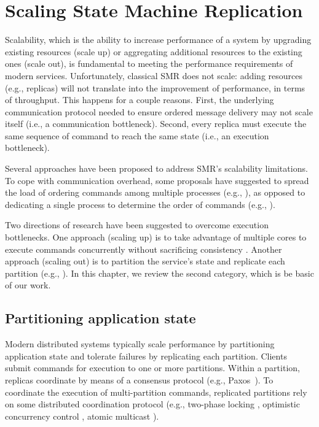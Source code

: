 \chapter[Scaling State Machine Replication]{Scaling State Machine Replication}

Scalability, which is the ability to increase performance of a system by
upgrading existing resources (scale up) or aggregating additional resources to
the existing ones (scale out), is fundamental to meeting the performance
requirements of modern services. Unfortunately, classical SMR does not scale:
adding resources (e.g., replicas) will not translate into the improvement of
performance, in terms of throughput. This happens for a couple reasons. First,
the underlying communication protocol needed to ensure ordered message delivery
may not scale itself (i.e., a communication bottleneck). Second, every replica
must execute the same sequence of command to reach the same state (i.e., an
execution bottleneck).

Several approaches have been proposed to address SMR's scalability limitations.
To cope with communication overhead, some proposals have suggested to spread the
load of ordering commands among multiple processes (e.g.,
\cite{Moraru:2013gw,Mencius,Marandi:2012hb}), as opposed to dedicating a single
process to determine the order of commands (e.g.,
\cite{Lamport:1998ea}).%

Two directions of research have been suggested to overcome execution
bottlenecks. One approach (scaling up) is to take advantage of multiple cores to
execute commands concurrently without sacrificing consistency
\cite{Kapritsos:2012um,Marandi:2014bj,Kotla:2004ep,Guo:2014jp}. Another approach
(scaling out) is to partition the service's state and replicate each partition
(e.g., \cite{Glendenning:2011kj,Marandi:2011dj}). In this chapter, we review the
second category, which is be basic of our work.

\section{Partitioning application state}

Modern distributed systems typically scale performance by partitioning
application state and tolerate failures by replicating each partition. Clients
submit commands for execution to one or more partitions. Within a partition,
replicas coordinate by means of a consensus protocol (e.g., Paxos~\cite{Lam98}).
To coordinate the execution of multi-partition commands, replicated partitions
rely on some distributed coordination protocol (e.g., two-phase locking
\cite{corbett2013spanner}, optimistic concurrency control \cite{Chang:2008},
atomic multicast \cite{bezerra2014ssmr}).

